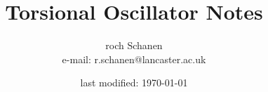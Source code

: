 \documentclass[a5paper, 10pt]{article}
\begin{document}

	\title{Torsional Oscillator Notes}

	\author{roch Schanen \\ e-mail: r.schanen@lancaster.ac.uk}

	\date{last modified: \today}

	\maketitle

	\tableofcontents

	\newpage



\end{document}
